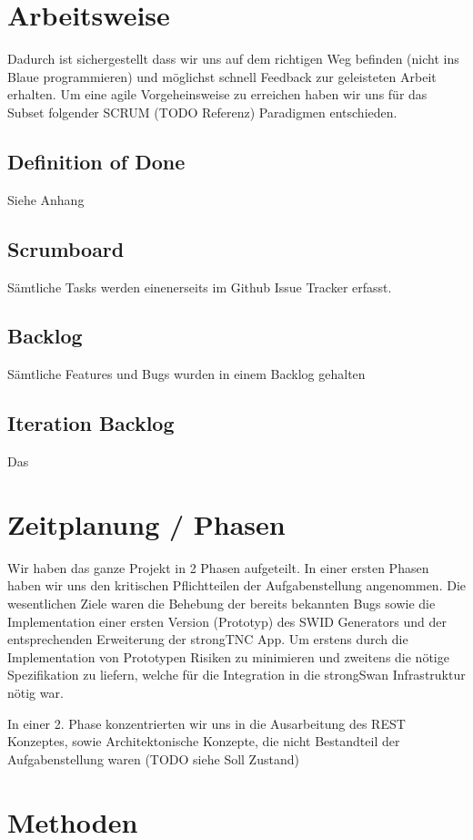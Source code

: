 \section{Arbeitsweise}

Dadurch ist sichergestellt dass wir uns auf dem richtigen Weg befinden (nicht ins Blaue programmieren) und möglichst schnell Feedback zur geleisteten Arbeit erhalten. Um eine agile Vorgeheinsweise zu erreichen haben wir uns für das Subset folgender SCRUM (TODO Referenz) Paradigmen entschieden.
\subsection{Definition of Done}
Siehe Anhang
\subsection{Scrumboard}
Sämtliche Tasks werden einenerseits im Github Issue Tracker erfasst. 
\subsection{Backlog}
Sämtliche Features und Bugs wurden in einem Backlog gehalten
\subsection{Iteration Backlog}

Das 

\section{Zeitplanung / Phasen}
Wir haben das ganze Projekt in 2 Phasen aufgeteilt. In einer ersten Phasen haben wir uns den kritischen Pflichtteilen der Aufgabenstellung angenommen. Die wesentlichen Ziele waren die Behebung der bereits bekannten Bugs sowie die Implementation einer ersten Version (Prototyp) des SWID Generators und der entsprechenden Erweiterung der strongTNC App. Um erstens durch die Implementation von Prototypen Risiken zu minimieren und zweitens die nötige Spezifikation zu liefern, welche für die Integration in die strongSwan Infrastruktur nötig war.

In einer 2. Phase konzentrierten wir uns in die Ausarbeitung des REST Konzeptes, sowie Architektonische Konzepte, die nicht Bestandteil der Aufgabenstellung waren (TODO siehe Soll Zustand)

\section{Methoden}
